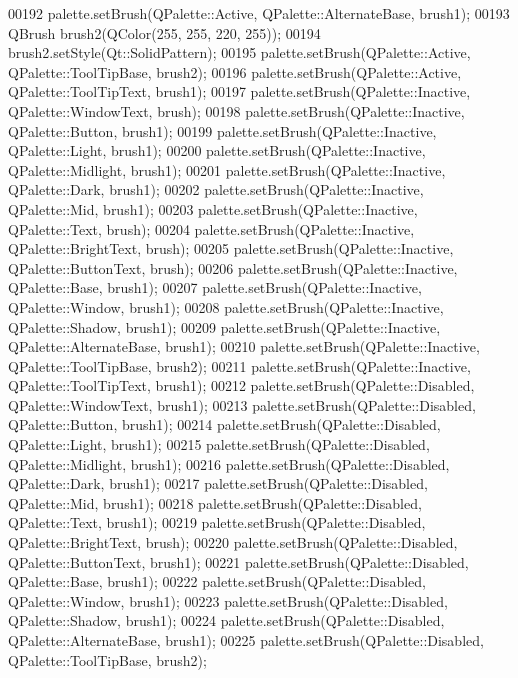 \begin{DoxyCode}
00192         palette.setBrush(QPalette::Active, QPalette::AlternateBase, brush1);
00193         QBrush brush2(QColor(255, 255, 220, 255));
00194         brush2.setStyle(Qt::SolidPattern);
00195         palette.setBrush(QPalette::Active, QPalette::ToolTipBase, brush2);
00196         palette.setBrush(QPalette::Active, QPalette::ToolTipText, brush1);
00197         palette.setBrush(QPalette::Inactive, QPalette::WindowText, brush);
00198         palette.setBrush(QPalette::Inactive, QPalette::Button, brush1);
00199         palette.setBrush(QPalette::Inactive, QPalette::Light, brush1);
00200         palette.setBrush(QPalette::Inactive, QPalette::Midlight, brush1);
00201         palette.setBrush(QPalette::Inactive, QPalette::Dark, brush1);
00202         palette.setBrush(QPalette::Inactive, QPalette::Mid, brush1);
00203         palette.setBrush(QPalette::Inactive, QPalette::Text, brush);
00204         palette.setBrush(QPalette::Inactive, QPalette::BrightText, brush);
00205         palette.setBrush(QPalette::Inactive, QPalette::ButtonText, brush);
00206         palette.setBrush(QPalette::Inactive, QPalette::Base, brush1);
00207         palette.setBrush(QPalette::Inactive, QPalette::Window, brush1);
00208         palette.setBrush(QPalette::Inactive, QPalette::Shadow, brush1);
00209         palette.setBrush(QPalette::Inactive, QPalette::AlternateBase, brush1);
00210         palette.setBrush(QPalette::Inactive, QPalette::ToolTipBase, brush2);
00211         palette.setBrush(QPalette::Inactive, QPalette::ToolTipText, brush1);
00212         palette.setBrush(QPalette::Disabled, QPalette::WindowText, brush1);
00213         palette.setBrush(QPalette::Disabled, QPalette::Button, brush1);
00214         palette.setBrush(QPalette::Disabled, QPalette::Light, brush1);
00215         palette.setBrush(QPalette::Disabled, QPalette::Midlight, brush1);
00216         palette.setBrush(QPalette::Disabled, QPalette::Dark, brush1);
00217         palette.setBrush(QPalette::Disabled, QPalette::Mid, brush1);
00218         palette.setBrush(QPalette::Disabled, QPalette::Text, brush1);
00219         palette.setBrush(QPalette::Disabled, QPalette::BrightText, brush);
00220         palette.setBrush(QPalette::Disabled, QPalette::ButtonText, brush1);
00221         palette.setBrush(QPalette::Disabled, QPalette::Base, brush1);
00222         palette.setBrush(QPalette::Disabled, QPalette::Window, brush1);
00223         palette.setBrush(QPalette::Disabled, QPalette::Shadow, brush1);
00224         palette.setBrush(QPalette::Disabled, QPalette::AlternateBase, brush1);
00225         palette.setBrush(QPalette::Disabled, QPalette::ToolTipBase, brush2);

\end{DoxyCode}
